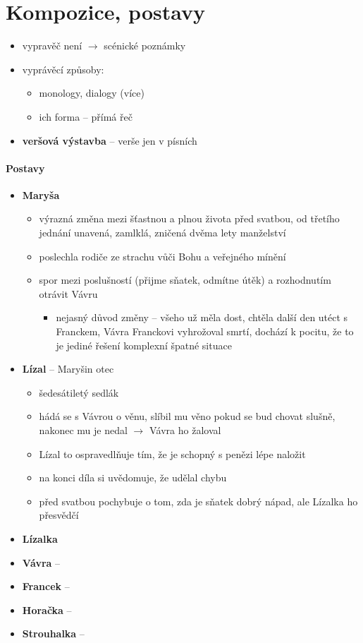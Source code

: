 \documentclass[10pt,a4paper]{article}
\newcommand{\ra}{$\rightarrow$ }
\begin{document}
\section*{Kompozice, postavy}
\begin{itemize}
\item vypravěč není \ra scénické poznámky
\item vyprávěcí způsoby:
	\begin{itemize}
	\item monology, dialogy (více)
	\item ich forma -- přímá řeč
	\end{itemize}
\item \textbf{veršová výstavba} -- verše jen v písních

\end{itemize}

\paragraph{Postavy}
\begin{itemize}
\item \textbf{Maryša}
	\begin{itemize}
	\item výrazná změna mezi šťastnou a plnou života před svatbou, od třetího jednání unavená, zamlklá, zničená dvěma lety manželství
	\item poslechla rodiče ze strachu vůči Bohu a veřejného mínění
	\item spor mezi poslušností (přijme sňatek, odmítne útěk) a rozhodnutím otrávit Vávru
		\begin{itemize}
		\item nejasný důvod změny -- všeho už měla dost, chtěla další den utéct s Franckem, Vávra Franckovi vyhrožoval smrtí, dochází k pocitu, že to je jediné řešení komplexní špatné situace
		\end{itemize}
	\end{itemize}
\item \textbf{Lízal} -- Maryšin otec
	\begin{itemize}
	\item šedesátiletý sedlák
	\item hádá se s Vávrou o věnu, slíbil mu věno pokud se bud chovat slušně, nakonec mu je nedal \ra Vávra ho žaloval
	\item Lízal to ospravedlňuje tím, že je schopný s penězi lépe naložit
	\item na konci díla si uvědomuje, že udělal chybu
	\item před svatbou pochybuje o tom, zda je sňatek dobrý nápad, ale Lízalka ho přesvědčí
	\end{itemize}
\item \textbf{Lízalka}
\item \textbf{Vávra} --
\item \textbf{Francek} --
\item \textbf{Horačka} --
\item \textbf{Strouhalka} -- 
\end{itemize}
\end{document}
